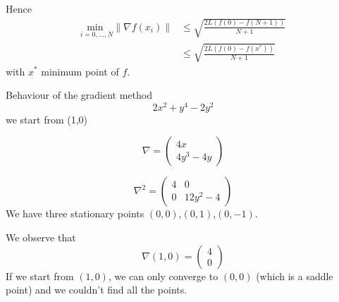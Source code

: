 Hence
\begin{align*}
\underset{i=0,...,N}{\text{min }} \|\nabla f(x_{i})\| & \leq \sqrt{\frac{2L(f(0)-f(N+1))}{N+1}} \\
& \leq \sqrt{\frac{2L(f(0)-f(x^*))}{N+1}}
\end{align*}
with $x^*$ minimum point of $f$.
 
\begin{example}\begin{leftbar} Behaviour of the gradient method
$$2x^{2}+y^{4}-2y^{2}$$
we start from (1,0)

 \begin{equation*}
   \nabla=
 \begin{pmatrix}
4x  \\
4y^{3}-4y
\end{pmatrix}
\end{equation*}

\begin{equation*}
   \nabla^{2}=
 \begin{pmatrix}
4 & 0 \\
0 & 12y^{2}-4
\end{pmatrix}
\end{equation*}
We have three stationary points $(0,0)$,$(0,1)$,$(0,-1)$. 

We observe that
 \begin{equation*}
   \nabla(1,0)=
 \begin{pmatrix}
4  \\
0
\end{pmatrix}
\end{equation*}
If we start from $(1,0)$, we can only converge to $(0,0)$ (which is a saddle point) and we couldn't find all the points. 
\end{leftbar}\end{example}








%
